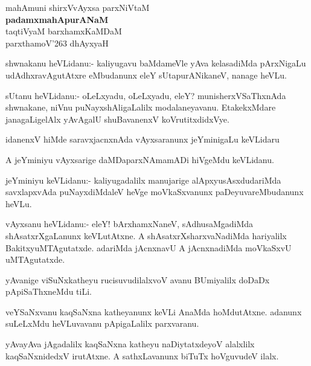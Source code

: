 
\begin{center}
mahAmuni shirxVvAyxsa parxNiVtaM\\[10pt]
{\Large{\bf padamxmahApurANaM}}\\[15pt]
taqtiVyaM barxhamxKaMDaM\\[10pt]
parxthamoV\char'263 dhAyxyaH
\end{center}

\begin{mng}
shwnakanu heVLidanu:- kaliyugavu baMdameVle yAva kelasadiMda pArxNigaLu udAdhxravAgutAtxre eMbudanunx eleY sUtapurANikaneV, nanage heVLu.
\end{mng}

\begin{mng}
sUtanu heVLidanu:- oLeLxyadu, oLeLxyadu, eleY? munisherxVSaThxnAda shwnakane, niVnu puNayxshAligaLalilx modalaneyavanu. EtakekxMdare janagaLigelAlx yAvAgalU shuBavanenxV koVrutitxdidxVye.
\end{mng}

\begin{mng}
idanenxV hiMde saravxjacnxnAda vAyxsaranunx jeYminigaLu keVLidaru
\end{mng}

\begin{mng}
A jeYminiyu vAyxsarige daMDaparxNAmamADi hiVgeMdu keVLidanu.
\end{mng}

\begin{mng}
jeYminiyu keVLidanu:- kaliyugadalilx manujarige alApxyusAsxdudariMda savxlapxvAda puNayxdiMdaleV heVge moVkaSxvanunx paDeyuvareMbudanunx heVLu.
\end{mng}

\begin{mng}
vAyxsanu heVLidanu:- eleY! bArxhamxNaneV, sAdhusaMgadiMda shAsatxrXgaLanunx keVLutAtxne. A shAsatxrXsharxvaNadiMda hariyalilx BakitxyuMTAgutatxde. adariMda jAcnxnavU A jAcnxnadiMda moVkaSxvU uMTAgutatxde.
\end{mng}

\begin{mng}
yAvanige viSuNxkatheyu rucisuvudilalxvoV avanu BUmiyalilx doDaDx pApiSaThxneMdu tiLi.
\end{mng}

\begin{mng}
veYSaNxvanu kaqSaNxna katheyanunx keVLi AnaMda hoMdutAtxne. adanunx suLeLxMdu heVLuvavanu pApigaLalilx parxvaranu.
\end{mng}

\begin{mng}
yAvayAva jAgadalilx kaqSaNxna katheyu naDiytatxdeyoV alalxlilx kaqSaNxnidedxV irutAtxne. A sathxLavanunx biTuTx hoVguvudeV ilalx.
\end{mng}

